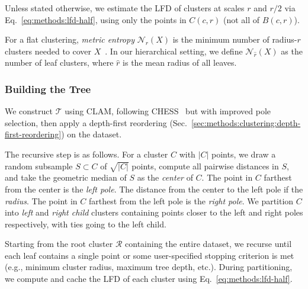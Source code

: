 Unless stated otherwise, we estimate the LFD of clusters at scales $r$ and $r/2$ via Eq.~\ref{eq:methods:lfd-half}, using only the points in $C(c,r)$ (not all of $B(c,r)$).

For a flat clustering, \emph{metric entropy} $\mathcal{N}_r(X)$ is the minimum number of radius-$r$ clusters needed to cover $X$~\cite{yu2015entropy}.
In our hierarchical setting, we define $\mathcal{N}_{\hat r}(X)$ as the number of leaf clusters, where $\hat r$ is the mean radius of all leaves.


\subsubsection{Building the Tree}
\label{sec:methods:clustering:building-the-tree}

We construct $\mathcal{T}$ using CLAM, following CHESS~\cite{ishaq2019clustered} but with improved pole selection, then apply a depth-first reordering (Sec.~\ref{sec:methods:clustering:depth-first-reordering}) on the dataset.

The recursive step is as follows.
For a cluster $C$ with $|C|$ points, we draw a random subsample $S\subset C$ of $\sqrt{|C|}$ points, compute all pairwise distances in $S$, and take the geometric median of $S$ as the \emph{center} of $C$.
The point in $C$ farthest from the center is the \emph{left pole}.
The distance from the center to the left pole if the \emph{radius}.
The point in $C$ farthest from the left pole is the \emph{right pole}.
We partition $C$ into \emph{left} and \emph{right child} clusters containing points closer to the left and right poles respectively, with ties going to the left child.

Starting from the root cluster $\mathcal{R}$ containing the entire dataset, we recurse until each leaf contains a single point or some user-specified stopping criterion is met (e.g., minimum cluster radius, maximum tree depth, etc.).
During partitioning, we compute and cache the LFD of each cluster using Eq.~\ref{eq:methods:lfd-half}.


